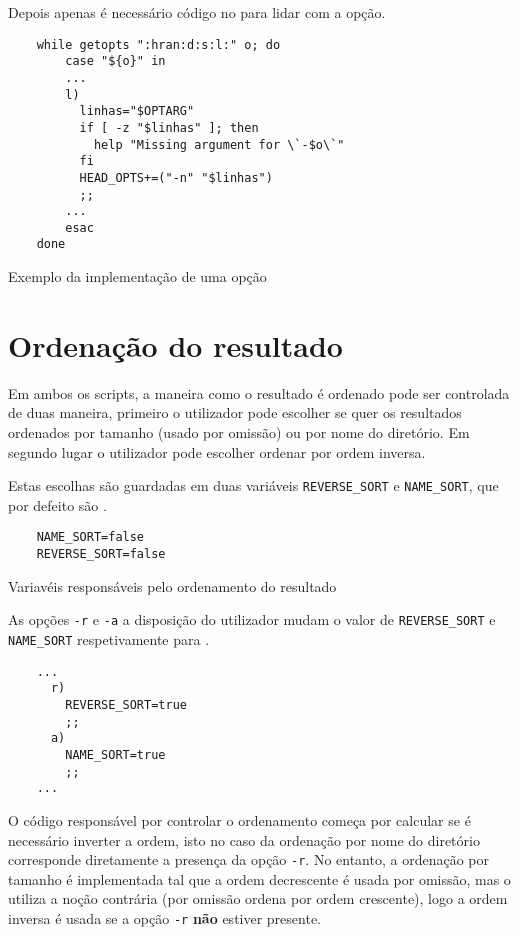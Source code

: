 Depois apenas é necessário código no  para lidar com a opção.

\begin{listing}[H]
	\centering
	\begin{verbatim}
    while getopts ":hran:d:s:l:" o; do
        case "${o}" in
        ...
        l)
          linhas="$OPTARG"
          if [ -z "$linhas" ]; then
            help "Missing argument for \`-$o\`"
          fi
          HEAD_OPTS+=("-n" "$linhas")
          ;;
        ...
        esac
    done
  \end{verbatim}
	\caption{Exemplo da implementação de uma opção}
\end{listing}

\section{Ordenação do resultado}

Em ambos os scripts, a maneira como o resultado é ordenado pode ser controlada
de duas maneira, primeiro o utilizador pode escolher se quer os resultados
ordenados por tamanho (usado por omissão) ou por nome do diretório. Em segundo
lugar o utilizador pode escolher ordenar por ordem inversa.

Estas escolhas são guardadas em duas variáveis \Verb|REVERSE_SORT| e
\Verb|NAME_SORT|, que por defeito são .

\begin{listing}[H]
	\centering
	\begin{verbatim}
    NAME_SORT=false
    REVERSE_SORT=false
  \end{verbatim}
	\caption{Variavéis responsáveis pelo ordenamento do resultado}
\end{listing}

As opções \Verb|-r| e \Verb|-a| a disposição do utilizador mudam o valor de
\Verb|REVERSE_SORT| e \Verb|NAME_SORT| respetivamente para .

\begin{listing}[H]
	\centering
	\begin{verbatim}
    ...
      r)
        REVERSE_SORT=true
        ;;
      a)
        NAME_SORT=true
        ;;
    ...
  \end{verbatim}
	\cprotect\caption{Processamento das opções \Verb|-r| e \Verb|-a|}
\end{listing}

O código responsável por controlar o ordenamento começa por calcular se é
necessário inverter a ordem, isto no caso da ordenação por nome do diretório
corresponde diretamente a presença da opção \Verb|-r|. No entanto, a ordenação
por tamanho é implementada tal que a ordem decrescente é usada por omissão,
mas o  utiliza a noção contrária (por omissão ordena por ordem
crescente), logo a ordem inversa é usada se a opção \Verb|-r| \textbf{não}
estiver presente.

